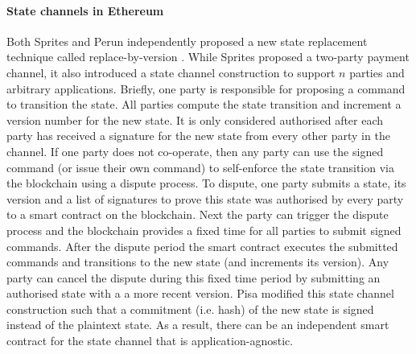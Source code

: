 \documentclass{llncs}
\begin{document}
\paragraph{State channels in Ethereum} 

Both Sprites  and Perun independently proposed a new state replacement technique called replace-by-version \cite{miller2017sprites,dziembowski2017perun}. 
While Sprites proposed a two-party payment channel, it also introduced a state channel construction to support $n$ parties and arbitrary applications. 
Briefly, one party is responsible for proposing a command to transition the state.
All parties compute the state transition and increment a version number for the new state. 
It is only considered authorised after each party has received a signature for the new state from every other party in the channel. 
If one party does not co-operate, then any party can use the signed command (or issue their own command) to self-enforce the state transition via the blockchain using a dispute process. 
To dispute, one party submits a state, its version and a list of signatures to prove this state was authorised by every party to a smart contract on the blockchain. 
Next the party can trigger the dispute process and the blockchain provides a fixed time for all parties to submit signed commands. 
After the dispute period the smart contract executes the submitted commands and transitions to the new state (and increments its version).  
Any party can cancel the dispute during this fixed time period by submitting an authorised state with a a more recent version. 
Pisa modified this state channel construction such that a commitment (i.e. hash) of the new state is signed instead of the plaintext state. 
As a result, there can be an independent smart contract for the state channel that is application-agnostic. 
\end{document}
